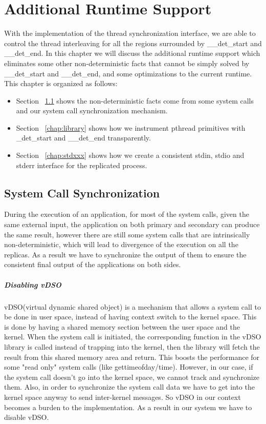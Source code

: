 \chapter{Additional Runtime Support}
With the implementation of the thread synchronization interface, we are able to control the thread interleaving for all the regions surrounded by \_\_det\_start and \_\_det\_end. In this chapter we will discuss the additional runtime support which eliminates some other non-deterministic facts that cannot be simply solved by \_\_det\_start and \_\_det\_end, and some optimizations to the current runtime. This chapter is organized as follows:

\begin{itemize}
  \item Section ~\ref{chap:syscall} shows the non-deterministic facts come from some system calls and our system call synchronization mechanism.
  \item Section ~\ref{chap:library} shows how we instrument pthread primitives with \_det\_start and \_\_det\_end transparently.
  \item Section ~\ref{chap:stdxxx} shows how we create a consistent stdin, stdio and stderr interface for the replicated process.
\end{itemize}

\section{System Call Synchronization} \label{chap:syscall}
During the execution of an application, for most of the system calls, given the same external input, the application on both primary and secondary can produce the same result, however there are still some system calls that are intrinsically non-deterministic, which will lead to divergence of the execution on all the replicas. As a result we have to synchronize the output of them to ensure the consistent final output of the applications on both sides.

\paragraph{Disabling vDSO}

vDSO(virtual dynamic shared object) is a mechanism that allows a system call to be done in user space, instead of having context switch to the kernel space. This is done by having a shared memory section between the user space and the kernel. When the system call is initiated, the corresponding function in the vDSO library is called instead of trapping into the kernel, then the library will fetch the result from this shared memory area and return. This boosts the performance for some "read only" system calls (like gettimeofday/time). However, in our case, if the system call doesn't go into the kernel space, we cannot track and synchronize them. Also, in order to synchronize the system call data we have to get into the kernel space anyway to send inter-kernel messages. So vDSO in our context becomes a burden to the implementation. As a result in our system we have to disable vDSO.

